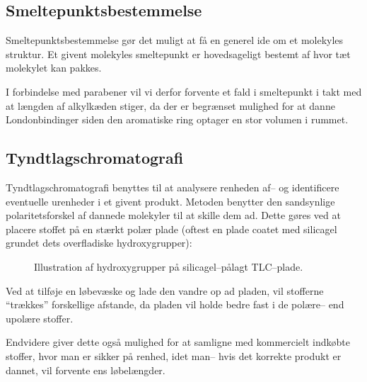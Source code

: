     \subsection{Smeltepunktsbestemmelse}
    Smeltepunktsbestemmelse gør det muligt at få en generel ide om et molekyles struktur. Et givent molekyles smeltepunkt er hovedsageligt bestemt af hvor tæt molekylet kan pakkes. 

    I forbindelse med parabener vil vi derfor forvente et fald i smeltepunkt i takt med at længden af alkylkæden stiger, da der er begrænset mulighed for at danne Londonbindinger siden den aromatiske ring optager en stor volumen i rummet.

    \subsection{Tyndtlagschromatografi}
    Tyndtlagschromatografi benyttes til at analysere renheden af-- og identificere eventuelle urenheder i et givent produkt. Metoden benytter den sandsynlige polaritetsforskel af dannede molekyler til at skille dem ad. Dette gøres ved at placere stoffet på en stærkt polær plade (oftest en plade coatet med silicagel grundet dets overfladiske hydroxygrupper):
    \begin{figure}[H]
        \caption{Illustration af hydroxygrupper på silicagel--pålagt TLC--plade.}
    \end{figure}
    Ved at tilføje en løbevæske og lade den vandre op ad pladen, vil stofferne ``trækkes'' forskellige afstande, da pladen vil holde bedre fast i de polære-- end upolære stoffer.

    Endvidere giver dette også mulighed for at samligne med kommercielt indkøbte stoffer, hvor man er sikker på renhed, idet man-- hvis det korrekte produkt er dannet, vil forvente ens løbelængder.
    
